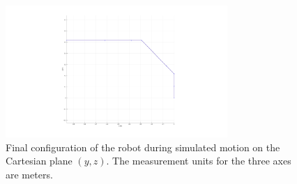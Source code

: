 \begin{figure}
	\centering
	\includegraphics[width=0.75\textwidth]{Resources/FinalConfiguration}
	\caption{Final configuration of the robot during simulated motion on the Cartesian plane $(y, z)$. The measurement units for the three axes are meters.}
	\label{fig::FinalConfiguration}
\end{figure}


